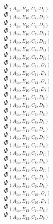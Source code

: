 \documentclass[14pt]{article}
\begin{document}
    $\Phi_{({A}_{14}, {B}_{10}, {C}_{4}, {D}_{1})}$ \\ 
    $\Phi_{({A}_{14}, {B}_{10}, {C}_{4}, {D}_{2})}$ \\ 
    $\Phi_{({A}_{14}, {B}_{10}, {C}_{4}, {D}_{3})}$ \\ 
    $\Phi_{({A}_{14}, {B}_{10}, {C}_{7}, {D}_{11})}$ \\ 
    $\Phi_{({A}_{14}, {B}_{10}, {C}_{7}, {D}_{12})}$ \\ 
    $\Phi_{({A}_{14}, {B}_{10}, {C}_{8}, {D}_{11})}$ \\ 
    $\Phi_{({A}_{14}, {B}_{10}, {C}_{8}, {D}_{12})}$ \\ 
    $\Phi_{({A}_{14}, {B}_{10}, {C}_{11}, {D}_{7})}$ \\ 
    $\Phi_{({A}_{14}, {B}_{10}, {C}_{11}, {D}_{8})}$ \\ 
    $\Phi_{({A}_{14}, {B}_{10}, {C}_{12}, {D}_{7})}$ \\ 
    $\Phi_{({A}_{14}, {B}_{10}, {C}_{12}, {D}_{8})}$ \\ 
    $\Phi_{({A}_{14}, {B}_{11}, {C}_{1}, {D}_{6})}$ \\ 
    $\Phi_{({A}_{14}, {B}_{11}, {C}_{2}, {D}_{6})}$ \\ 
    $\Phi_{({A}_{14}, {B}_{11}, {C}_{3}, {D}_{6})}$ \\ 
    $\Phi_{({A}_{14}, {B}_{11}, {C}_{6}, {D}_{1})}$ \\ 
    $\Phi_{({A}_{14}, {B}_{11}, {C}_{6}, {D}_{2})}$ \\ 
    $\Phi_{({A}_{14}, {B}_{11}, {C}_{6}, {D}_{3})}$ \\ 
    $\Phi_{({A}_{14}, {B}_{11}, {C}_{7}, {D}_{9})}$ \\ 
    $\Phi_{({A}_{14}, {B}_{11}, {C}_{7}, {D}_{10})}$ \\ 
    $\Phi_{({A}_{14}, {B}_{11}, {C}_{8}, {D}_{9})}$ \\ 
    $\Phi_{({A}_{14}, {B}_{11}, {C}_{8}, {D}_{10})}$ \\ 
    $\Phi_{({A}_{14}, {B}_{11}, {C}_{9}, {D}_{7})}$ \\ 
    $\Phi_{({A}_{14}, {B}_{11}, {C}_{9}, {D}_{8})}$ \\ 
    $\Phi_{({A}_{14}, {B}_{11}, {C}_{10}, {D}_{7})}$ \\ 
    $\Phi_{({A}_{14}, {B}_{11}, {C}_{10}, {D}_{8})}$ \\ 
    $\Phi_{({A}_{14}, {B}_{12}, {C}_{1}, {D}_{6})}$ \\ 
    $\Phi_{({A}_{14}, {B}_{12}, {C}_{2}, {D}_{6})}$ \\ 
\end{document}
